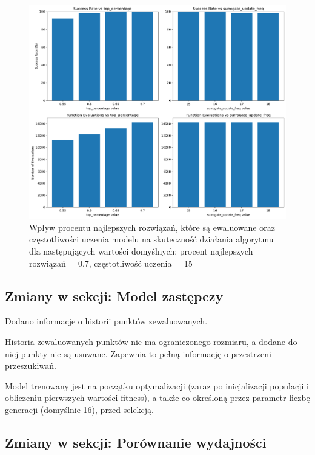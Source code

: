 \documentclass{article}
\begin{document}
\begin{figure}[H]
    \centering
    \includegraphics[width=\textwidth]{surrogate_de_parameter_tuning_results3.png}
    \caption{Wpływ procentu najlepszych rozwiązań, które są ewaluowane oraz częstotliwości uczenia modelu na skuteczność działania algorytmu dla następujących wartości domyślnych: procent najlepszych rozwiązań = 0.7, częstotliwość uczenia = 15}
    \label{fig:surogate_de_parameter_results3}
\end{figure}


\subsection{Zmiany w sekcji: Model zastępczy}

Dodano informacje o historii punktów zewaluowanych.

Historia zewaluowanych punktów nie ma ograniczonego rozmiaru, a dodane do niej punkty nie są usuwane. Zapewnia to pełną informację o przestrzeni przeszukiwań.

Model trenowany jest na początku optymalizacji (zaraz po inicjalizacji populacji i obliczeniu pierwszych wartości fitness), a także co określoną przez parametr liczbę generacji (domyślnie 16), przed selekcją. 

\subsection{Zmiany w sekcji: Porównanie wydajności}
\end{document}
